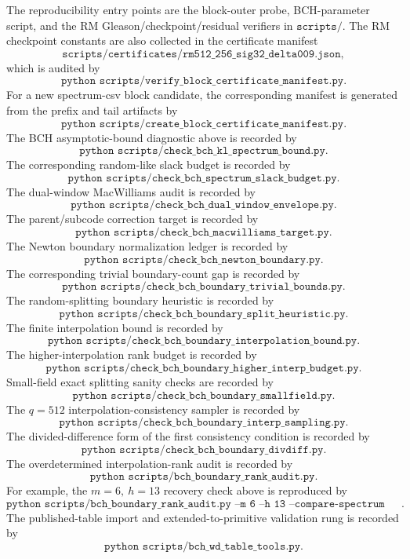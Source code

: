 The reproducibility entry points are the block-outer probe, BCH-parameter script, and the RM Gleason/checkpoint/residual
verifiers in \(\texttt{scripts/}\).  The RM checkpoint constants are also collected in the certificate manifest
\[
\texttt{scripts/certificates/rm512\_256\_sig32\_delta009.json},
\]
which is audited by
\[
\texttt{python scripts/verify\_block\_certificate\_manifest.py}.
\]
For a new spectrum-csv block candidate, the corresponding manifest is generated from the prefix and tail artifacts by
\[
\texttt{python scripts/create\_block\_certificate\_manifest.py}.
\]
The BCH asymptotic-bound diagnostic above is recorded by
\[
\texttt{python scripts/check\_bch\_kl\_spectrum\_bound.py}.
\]
The corresponding random-like slack budget is recorded by
\[
\texttt{python scripts/check\_bch\_spectrum\_slack\_budget.py}.
\]
The dual-window MacWilliams audit is recorded by
\[
\texttt{python scripts/check\_bch\_dual\_window\_envelope.py}.
\]
The parent/subcode correction target is recorded by
\[
\texttt{python scripts/check\_bch\_macwilliams\_target.py}.
\]
The Newton boundary normalization ledger is recorded by
\[
\texttt{python scripts/check\_bch\_newton\_boundary.py}.
\]
The corresponding trivial boundary-count gap is recorded by
\[
\texttt{python scripts/check\_bch\_boundary\_trivial\_bounds.py}.
\]
The random-splitting boundary heuristic is recorded by
\[
\texttt{python scripts/check\_bch\_boundary\_split\_heuristic.py}.
\]
The finite interpolation bound is recorded by
\[
\texttt{python scripts/check\_bch\_boundary\_interpolation\_bound.py}.
\]
The higher-interpolation rank budget is recorded by
\[
\texttt{python scripts/check\_bch\_boundary\_higher\_interp\_budget.py}.
\]
Small-field exact splitting sanity checks are recorded by
\[
\texttt{python scripts/check\_bch\_boundary\_smallfield.py}.
\]
The \(q=512\) interpolation-consistency sampler is recorded by
\[
\texttt{python scripts/check\_bch\_boundary\_interp\_sampling.py}.
\]
The divided-difference form of the first consistency condition is recorded by
\[
\texttt{python scripts/check\_bch\_boundary\_divdiff.py}.
\]
The overdetermined interpolation-rank audit is recorded by
\[
\texttt{python scripts/bch\_boundary\_rank\_audit.py}.
\]
For example, the \(m=6,\ h=13\) recovery check above is reproduced by
\[
\texttt{python scripts/bch\_boundary\_rank\_audit.py --m 6 --h 13 --compare-spectrum scripts/bch63\_30\_delta13\_spectrum.csv recover-polys --trials 200000 --seed 23}.
\]
The published-table import and extended-to-primitive validation rung is recorded by
\[
\texttt{python scripts/bch\_wd\_table\_tools.py}.
\]
